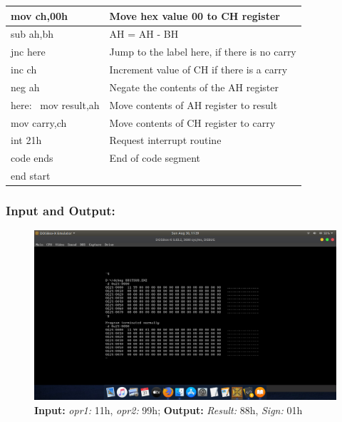 \documentclass[12pt,a4paper]{article}
\begin{document}
\begin{flushleft}
\begin{table}[htb]
{\begin{tabular}{|l|l|}
\hline
mov ch,00h                                                       & Move hex value 00 to CH register              \\ 
\hline
sub ah,bh                                                        & AH = AH - BH                                  \\ 
\hline
jnc here                                                         & Jump to the label here, if there is no carry  \\ 
\hline
inc ch                                                           & Increment value of CH if there is a carry     \\ 
\hline
neg ah                                                           & Negate the contents of the AH register        \\
\hline
here:~ mov result,ah                                             & Move contents of AH register to result        \\ 
\hline
mov carry,ch                                                     & Move contents of CH register to carry         \\ 
\hline
int 21h                                                          & Request interrupt routine                     \\ 
\hline
code ends                                                        & End of code segment                           \\
\hline
end start                                                        &                                               \\
\hline
\end{tabular}
}
\end{table}

\newpage
\subsubsection*{\textbf{Input and Output:}}
\begin{figure}[h]
    \centering
    \includegraphics[trim = 100mm 70mm 100mm 80mm, clip, width = \textwidth]{Pics/Subtraction.png}
    \caption{ \textbf{Input:} \emph{opr1:} 11h, \emph{opr2:} 99h; 
              \textbf{Output:} \emph{Result:} 88h, \emph{Sign:} 01h}
\end{figure}



\end{flushleft}
\end{document}
